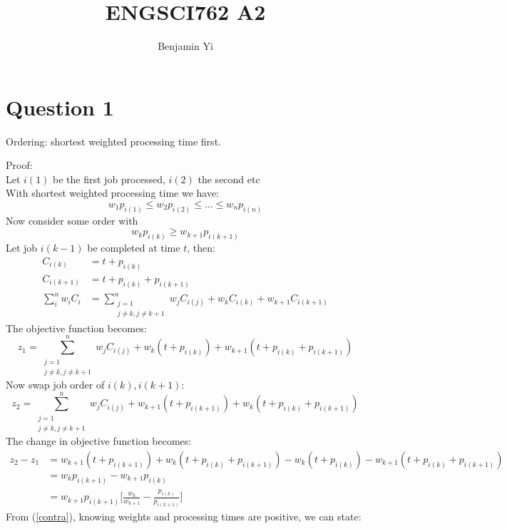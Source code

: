 \documentclass[10pt,a4paper]{article}
\begin{document}
\title{ENGSCI762 A2}
\author{Benjamin Yi}
	
\section*{Question 1}
Ordering: shortest weighted processing time first.

Proof: \\
Let \(i(1)\) be the first job processed, \(i(2)\) the second etc\\
With shortest weighted processing time we have:\\
\begin{equation*}
	w_1p_{i(1)} \leq w_2p_{i(2)} \leq \dots \leq w_np_{i(n)}
\end{equation*}
Now consider some order with 
\begin{equation}\label{contra}
	w_kp_{i(k)} \geq w_{k+1}p_{i(k+1)}
\end{equation}
Let job \(i(k-1)\) be completed at time \(t\), then:
\begin{align*}
	C_{i(k)} &= t + p_{i(k)}\\
	C_{i(k+1)} &= t + p_{i(k)} + p_{i(k+1)}\\
	\sum_i^n w_iC_i &= \sum_{\substack{j=1\\j \ne k, j \ne k+1}}^n w_jC_{i(j)} + w_kC_{i(k)} + w_{k+1}C_{i(k+1)}
\end{align*}
The objective function becomes:
\begin{equation*}
	z_1 =  \sum_{\substack{j=1\\j \ne k, j \ne k+1}}^n w_jC_{i(j)} + w_k(t + p_{i(k)}) + w_{k+1}(t + p_{i(k)} + p_{i(k+1)})
\end{equation*}
Now swap job order of \(i(k), i(k+1)\):
\begin{equation*}
	z_2 =  \sum_{\substack{j=1\\j \ne k, j \ne k+1}}^n w_jC_{i(j)} + w_{k+1}(t + p_{i(k+1)}) + w_k(t + p_{i(k)} + p_{i(k+1)})
\end{equation*}
The change in objective function becomes:
\begin{align*}
	z_2 - z_1 &= w_{k+1}(t + p_{i(k+1)}) + w_k(t + p_{i(k)} + p_{i(k+1)}) - w_k(t + p_{i(k)}) - w_{k+1}(t + p_{i(k)} + p_{i(k+1)})\\
	&= w_kp_{i(k+1)} - w_{k+1}p_{i(k)}\\
	&= w_{k+1}p_{i(k+1)}\bigg[\frac{w_k}{w_{k+1}} - \frac{p_{i(k)}}{p_{i(k+1)}}\bigg]
\end{align*}
From (\ref{contra}), knowing weights and processing times are positive, we can state:
\end{document}
